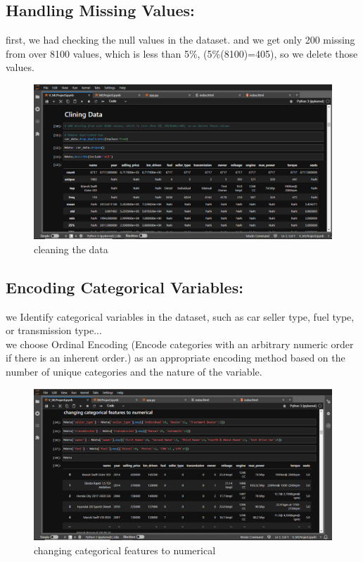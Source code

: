 \documentclass{article}
\begin{document}
\subsection{Handling Missing Values:}
first, we had checking the null values in the dataset. and we get only 200 missing from over 8100 values, which is less than 5\%, (5\%(8100)=405), so we delete those values.

\begin{figure}[!h]
    \centering
    \includegraphics[width=1\textwidth]{clean.png}
    \caption{cleaning the data}
    \label{fig:my_label}
\end{figure}

\subsection{Encoding Categorical Variables:}
we Identify categorical variables in the dataset, such as car seller type, fuel type, or transmission type...\\
we choose Ordinal Encoding (Encode categories with an arbitrary numeric order if there is an inherent order.) as an appropriate encoding method based on the number of unique categories and the nature of the variable.

\begin{figure}[!h]
    \centering
    \includegraphics[width=1\textwidth]{to-num.png}
    \caption{changing categorical features to numerical}
    \label{fig:my_label}
\end{figure}
\end{document}

